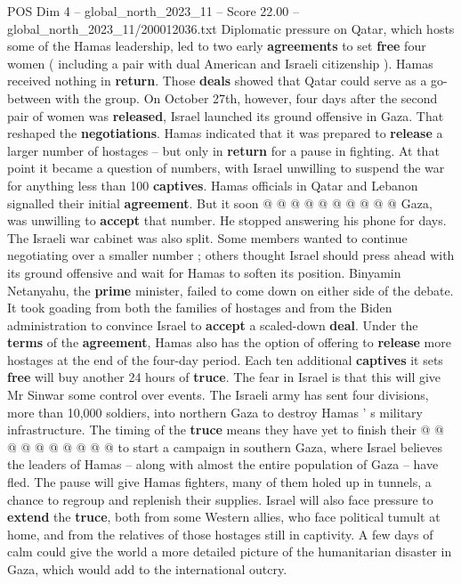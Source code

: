 \begin{textsample}{POS Dim 4 – global\_north\_2023\_11 – Score 22.00 – global\_north\_2023\_11/200012036.txt}
Diplomatic pressure on Qatar, which hosts some of the Hamas leadership, led to two early \textbf{agreements} to set \textbf{free} four women ( including a pair with dual American and Israeli citizenship ).
Hamas received nothing in \textbf{return}.
Those \textbf{deals} showed that Qatar could serve as a go-between with the group.
On October 27th, however, four days after the second pair of women was \textbf{released}, Israel launched its ground offensive in Gaza.
That reshaped the \textbf{negotiations}.
Hamas indicated that it was prepared to \textbf{release} a larger number of hostages -- but only in \textbf{return} for a pause in fighting.
At that point it became a question of numbers, with Israel unwilling to suspend the war for anything less than 100 \textbf{captives}.
Hamas officials in Qatar and Lebanon signalled their initial \textbf{agreement}.
But it soon @ @ @ @ @ @ @ @ @ @ Gaza, was unwilling to \textbf{accept} that number.
He stopped answering his phone for days.
The Israeli war cabinet was also split.
Some members wanted to continue negotiating over a smaller number ; others thought Israel should press ahead with its ground offensive and wait for Hamas to soften its position.
Binyamin Netanyahu, the \textbf{prime} minister, failed to come down on either side of the debate.
It took goading from both the families of hostages and from the Biden administration to convince Israel to \textbf{accept} a scaled-down \textbf{deal}.
Under the \textbf{terms} of the \textbf{agreement}, Hamas also has the option of offering to \textbf{release} more hostages at the end of the four-day period.
Each ten additional \textbf{captives} it sets \textbf{free} will buy another 24 hours of \textbf{truce}.
The fear in Israel is that this will give Mr Sinwar some control over events.
The Israeli army has sent four divisions, more than 10,000 soldiers, into northern Gaza to destroy Hamas ' s military infrastructure.
The timing of the \textbf{truce} means they have yet to finish their @ @ @ @ @ @ @ @ @ @ to start a campaign in southern Gaza, where Israel believes the leaders of Hamas -- along with almost the entire population of Gaza -- have fled.
The pause will give Hamas fighters, many of them holed up in tunnels, a chance to regroup and replenish their supplies.
Israel will also face pressure to \textbf{extend} the \textbf{truce}, both from some Western allies, who face political tumult at home, and from the relatives of those hostages still in captivity.
A few days of calm could give the world a more detailed picture of the humanitarian disaster in Gaza, which would add to the international outcry.

\end{textsample}
